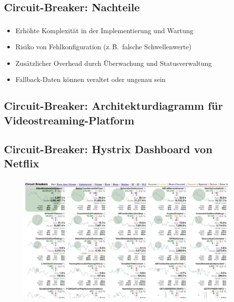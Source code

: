 \subsection{Circuit-Breaker: Nachteile}
\begin{frame}
    \frametitle{\insertsection}
    \framesubtitle{\insertsubsection}

    \begin{itemize}
        \item Erhöhte Komplexität in der Implementierung und Wartung
        \item Risiko von Fehlkonfiguration (z.\,B.\ falsche Schwellenwerte)
        \item Zusätzlicher Overhead durch Überwachung und Statusverwaltung
        \item Fallback-Daten können veraltet oder ungenau sein
    \end{itemize}
\end{frame}

\subsection{Circuit-Breaker: Architekturdiagramm für Videostreaming-Platform}
\begin{frame}
    \frametitle{\insertsection}
    \framesubtitle{\insertsubsection}

    \vspace*{-14pt}
    \begin{figure}[h]
        \centering
		\resizebox{!}{.72\textheight}{%
			
		}
		\captionsetup{aboveskip=2pt}
    \end{figure}
\end{frame}

\subsection{Circuit-Breaker: Hystrix Dashboard von Netflix\cite{Schmaus.11.12.2012}}
\begin{frame}
    \frametitle{\insertsection}
    \framesubtitle{\insertsubsection}

    \vspace*{-14pt}
    \begin{figure}[h]
        \centering
        \includegraphics[height=0.68\textheight]{../images/Hystrix-Dashboard}
    \end{figure}
\end{frame}

